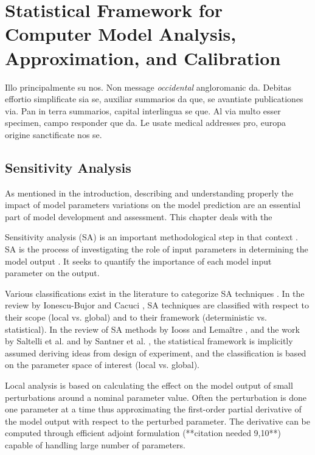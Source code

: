 \section{Statistical Framework for Computer Model Analysis, Approximation, and Calibration}\label{sec:intro_statistical_framework}
Illo principalmente su nos. Non message \emph{occidental} angloromanic
da. Debitas effortio simplificate sia se, auxiliar summarios da que,
se avantiate publicationes via. Pan in terra summarios, capital
interlingua se que. Al via multo esser specimen, campo responder que
da. Le usate medical addresses pro, europa origine sanctificate nos
se.

\subsection{Sensitivity Analysis}
As mentioned in the introduction, describing and understanding properly the impact of model parameters variations on the model prediction are an essential part of model development and assessment. 
This chapter deals with the 

Sensitivity analysis (SA) is an important methodological step in that context \cite{Trucano2006}.
SA is the process of investigating the role of input parameters in determining the model output \cite{Iooss2015}. 
It seeks to quantify the importance of each model input parameter on the output.

Various classifications exist in the literature to categorize SA techniques \cite{Frey2002, Ionescu-Bujor2004, Cacuci2004, Saltelli2008, Iooss2015}.
In the review by Ionescu-Bujor and Cacuci \cite{Ionescu-Bujor2004, Cacuci2004}, 
SA techniques are classified with respect to their scope (local vs. global) and to their framework (deterministic vs. statistical).
In the review of SA methods by Iooss and Lemaître \cite{Iooss2015}, 
and the work by Saltelli et al. \cite{Saltelli2008} and by Santner et al. \cite{Santner2003}, 
the statistical framework is implicitly assumed deriving ideas from design of experiment, 
and the classification is based on the parameter space of interest (local vs. global).

Local analysis is based on calculating the effect on the model output of small perturbations around a nominal parameter value. 
Often the perturbation is done one parameter at a time thus approximating the first-order partial derivative of the model output with respect to the perturbed parameter. 
The derivative can be computed through efficient adjoint formulation (**citation needed 9,10**) capable of handling large number of parameters.

